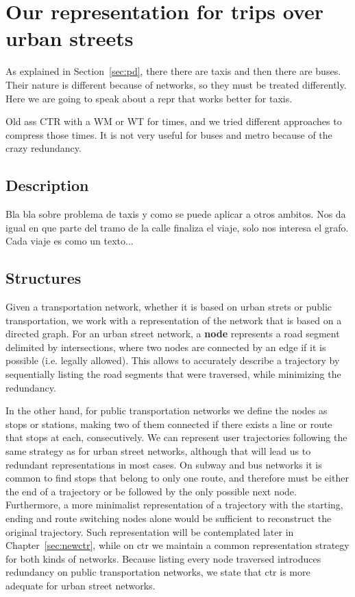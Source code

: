 \documentclass[a4paper,10pt,twoside]{book}
\begin{document}
	\chapter{Our representation for trips over urban streets}
	As explained in Section~\ref{sec:pd}, there there are taxis and then there are buses. Their nature is different because of networks, so they must be treated differently. Here we are going to speak about a repr that works better for taxis.
	
	Old ass CTR \cite{brisaboa2018compact} with a WM or WT for times, and we tried different approaches to compress those times. It is not very useful for buses and metro because of the crazy redundancy.
	
	\section{Description}
	Bla bla sobre problema de taxis y como se puede aplicar a otros ambitos. Nos da igual en que parte del tramo de la calle finaliza el viaje, solo nos interesa el grafo. Cada viaje es como un texto...
	
	\section{Structures}
	Given a transportation network, whether it is based on urban strets or public transportation, we work with a representation of the network that is based on a directed graph. For an urban street network, a \textbf{node} represents a road segment delimited by intersections, where two nodes are connected by an edge if it is possible (i.e. legally allowed). This allows to accurately describe a trajectory by sequentially listing the road segments that were traversed, while minimizing the redundancy.
	
	In the other hand, for public transportation networks we define the nodes as stops or stations, making two of them connected if there exists a line or route that stops at each, consecutively. We can represent user trajectories following the same strategy as for urban street networks, although that will lead us to redundant representations in most cases. On subway and bus networks it is common to find stops that belong to only one route, and therefore must be either the end of a trajectory or be followed by the only possible next node. Furthermore, a more minimalist representation of a trajectory with the starting, ending and route switching nodes alone would be sufficient to reconstruct the original trajectory. Such representation will be contemplated later in Chapter~\ref{sec:newctr}, while on \gls{ctr} we maintain a common representation strategy for both kinds of networks. Because listing every node traversed introduces redundancy on public transportation networks, we state that \gls{ctr} is more adequate for urban street networks.
	
\end{document}
